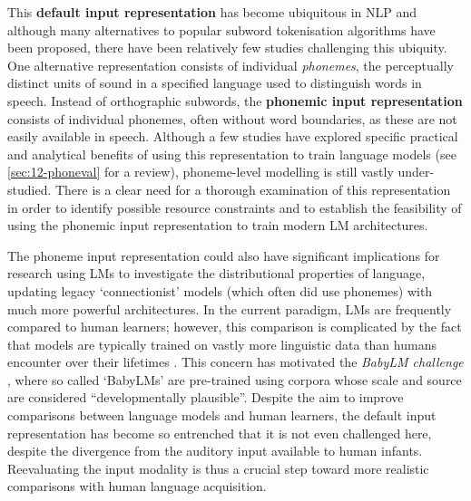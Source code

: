 This \textbf{default input representation} has become ubiquitous in NLP and although many alternatives to popular subword tokenisation algorithms have been proposed, there have been relatively few studies challenging this ubiquity. One alternative representation consists of individual \emph{phonemes}, the perceptually distinct units of sound in a specified language used to distinguish words in speech. Instead of orthographic subwords, the \textbf{phonemic input representation} consists of individual phonemes, often without word boundaries, as these are not easily available in speech. Although a few studies have explored specific practical and analytical benefits of using this representation to train language models (see \cref{sec:12-phoneval} for a review), phoneme-level modelling is still vastly under-studied. There is a clear need for a thorough examination of this representation in order to identify possible resource constraints %
and to establish the feasibility of using the phonemic input representation to train modern LM architectures.%


The phoneme input representation could also have significant implications for research using LMs to investigate the distributional properties of language, updating legacy `connectionist' models (which often did use phonemes) with much more powerful architectures. In the current paradigm, LMs are frequently compared to human learners; however, this comparison is complicated by the fact that models are typically trained on vastly more linguistic data than humans encounter over their lifetimes \citep{huebner-etal-2021-babyberta}. This concern has motivated the \emph{BabyLM challenge} \citep{warstadt-2023-babylm-findings,conll-2024-babylm}, where so called `BabyLMs' are pre-trained using corpora whose scale and source are considered ``developmentally plausible''. Despite the aim to improve comparisons between language models and human learners, the default input representation has become so entrenched that it is not even challenged here, despite the divergence from the auditory input available to human infants. Reevaluating the input modality is thus a crucial step toward more realistic comparisons with human language acquisition.

